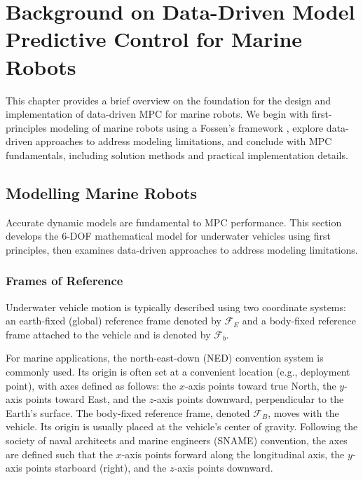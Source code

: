 




\chapter{Background on Data-Driven Model Predictive Control for Marine Robots}
\label{ch:background}

This chapter provides a brief overview on the foundation for the design and implementation of data-driven MPC for marine robots. We begin with first-principles modeling of marine robots using a Fossen's framework \cite{fossen}, explore data-driven approaches to address modeling limitations, and conclude with MPC fundamentals, including solution methods and practical implementation details.

\section{Modelling Marine Robots}
\label{sec:modelling}
Accurate dynamic models are fundamental to MPC performance. This section develops the 6-DOF mathematical model for underwater vehicles using first principles, then examines data-driven approaches to address modeling limitations.
\subsection{Frames of Reference}
Underwater vehicle motion is typically described using two coordinate systems: an earth-fixed (global) reference frame denoted by $\mathcal{F}_E$ and a body-fixed reference frame attached to the vehicle and is denoted by $\mathcal{F}_b$.

For marine applications, the north-east-down (NED) convention system is commonly used. Its origin is often set at a convenient location (e.g., deployment point), with axes defined as follows: the $x$-axis points toward true North, the $y$-axis points toward East, and the $z$-axis points downward, perpendicular to the Earth's surface. The body-fixed reference frame, denoted $\mathcal{F}_B$, moves with the vehicle. Its origin is usually placed at the vehicle's center of gravity. Following the society of naval architects and marine engineers (SNAME) convention, the axes are defined such that the $x$-axis points forward along the longitudinal axis, the $y$-axis points starboard (right), and the $z$-axis points downward.

